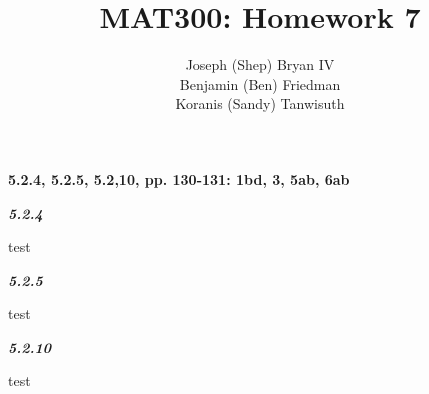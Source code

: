 \documentclass{article}
\begin{document}
\title{MAT300: Homework 7}
\author{
	Joseph (Shep) Bryan IV \\
	Benjamin (Ben) Friedman\\
	Koranis (Sandy) Tanwisuth
}

\maketitle
	\begin{flushleft}
		\textbf{ 5.2.4, 5.2.5, 5.2,10, pp. 130-131: 1bd, 3, 5ab, 6ab}
		\\ \vspace{3mm}
		
		\textbf{\textit{5.2.4}}
		\begin{flushleft}
			test
		\end{flushleft}
	
		\textbf{\textit{5.2.5}}
		\begin{flushleft}
			test
		\end{flushleft}
		
		\textbf{\textit{5.2.10}}
		\begin{flushleft}
			test
		\end{flushleft}
		
	\end{flushleft}
\end{document}
